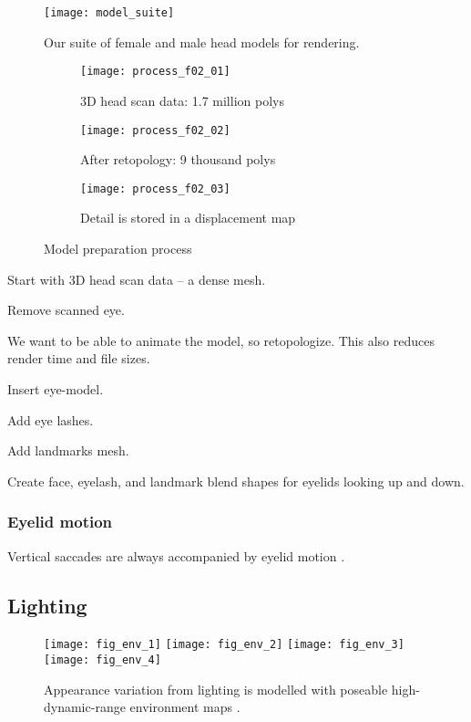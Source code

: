 \begin{figure*}
    \texttt{[image: model\_suite]}
    \caption{Our suite of female and male head models for rendering.}
    \label{fig:model_suite}
\end{figure*}

\begin{figure}
    \centering
    \begin{subfigure}[t]{0.325\columnwidth}
        \texttt{[image: process\_f02\_01]}
        \caption{3D head scan data: 1.7 million polys}
        \label{fig:3d_eye_model}
    \end{subfigure}%
    \hfill
    \begin{subfigure}[t]{0.325\columnwidth}
        \texttt{[image: process\_f02\_02]}
        \caption{After retopology: 9 thousand polys}
        \label{fig:3d_eye_model}
    \end{subfigure}%
    \hfill
    \begin{subfigure}[t]{0.325\columnwidth}
        \texttt{[image: process\_f02\_03]}
        \caption{Detail is stored in a displacement map}
        \label{fig:3d_eye_model}
    \end{subfigure}%
    \caption{Model preparation process}
    \label{fig:process}
\end{figure}

Start with 3D head scan data -- a dense mesh.

Remove scanned eye.

We want to be able to animate the model, so retopologize. This also reduces render time and file sizes.

Insert eye-model.

Add eye lashes.

Add landmarks mesh.

Create face, eyelash, and landmark blend shapes for eyelids looking up and down.

\subsubsection{Eyelid motion}

Vertical saccades are always accompanied by eyelid motion \cite{liversedge2011oxford}.

\subsection{Lighting}

\begin{figure}
    \texttt{[image: fig\_env\_1]} \hfill
    \texttt{[image: fig\_env\_2]} \hfill
    \texttt{[image: fig\_env\_3]} \hfill
    \texttt{[image: fig\_env\_4]}
    \caption{Appearance variation from lighting is modelled with poseable high-dynamic-range environment maps \cite{debevec2002image}.}
    \label{fig:participants}
\end{figure}
